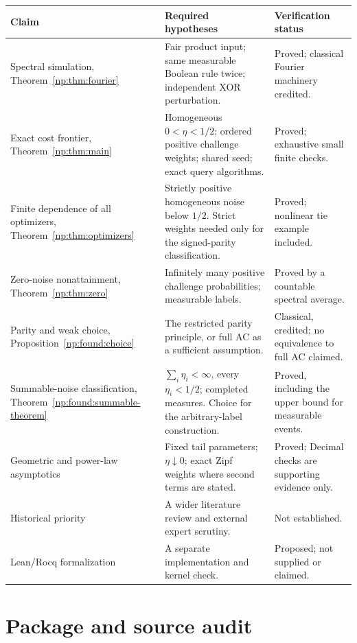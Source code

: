 \documentclass[11pt,a4paper]{article}
\theoremstyle{definition}
\theoremstyle{remark}
\begin{document}
\begingroup\small
\begin{longtable}{@{}L{.31\textwidth}L{.39\textwidth}L{.21\textwidth}@{}}
\toprule
Claim & Required hypotheses & Verification status\\
\midrule
\endhead
Spectral simulation,
Theorem~\ref{np:thm:fourier}&
Fair product input; same measurable Boolean rule twice; independent
XOR perturbation.&
Proved; classical Fourier machinery credited.\\
Exact cost frontier,
Theorem~\ref{np:thm:main}&
Homogeneous \(0<\eta<1/2\); ordered positive challenge weights;
shared seed; exact query algorithms.&
Proved; exhaustive small finite checks.\\
Finite dependence of all optimizers,
Theorem~\ref{np:thm:optimizers}&
Strictly positive homogeneous noise below \(1/2\).
Strict weights needed only for the signed-parity classification.&
Proved; nonlinear tie example included.\\
Zero-noise nonattainment,
Theorem~\ref{np:thm:zero}&
Infinitely many positive challenge probabilities; measurable labels.&
Proved by a countable spectral average.\\
Parity and weak choice,
Proposition~\ref{np:found:choice}&
The restricted parity principle, or full AC as a sufficient assumption.&
Classical, credited; no equivalence to full AC claimed.\\
Summable-noise classification,
Theorem~\ref{np:found:summable-theorem}&
\(\sum_i\eta_i<\infty\), every \(\eta_i<1/2\); completed measures.
Choice for the arbitrary-label construction.&
Proved, including the upper bound for measurable events.\\
Geometric and power-law asymptotics&
Fixed tail parameters; \(\eta\downarrow0\); exact Zipf weights
where second terms are stated.&
Proved; Decimal checks are supporting evidence only.\\
Historical priority&
A wider literature review and external expert scrutiny.&
Not established.\\
Lean/Rocq formalization&
A separate implementation and kernel check.&
Proposed; not supplied or claimed.\\
\bottomrule
\end{longtable}
\endgroup

\section{Package and source audit}\label{np:app:package}
\end{document}
